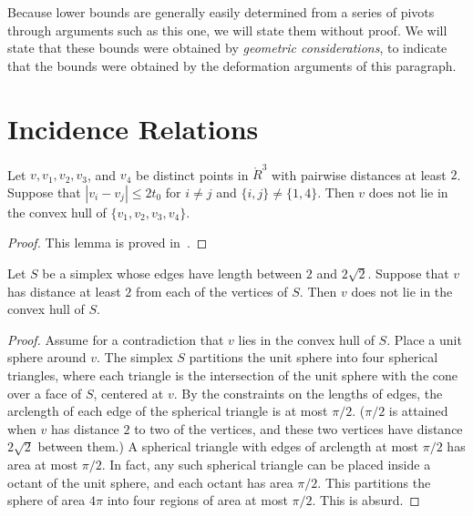 Because lower bounds are generally easily determined from a series
of pivots through arguments such as this one, we will state them
without proof. We will state that these bounds were obtained by
{\it geometric considerations}, to indicate that the bounds were
obtained by the deformation arguments of this paragraph.


\section{Incidence Relations}


\begin{lemma} \label{lemma:v-interior-alt}
Let $v,v_1,v_2,v_3$, and $v_4$ be distinct points in $\ring{R}^3$
with pairwise distances at least $2$.  Suppose that $|v_i-v_j|\le
2t_0$ for $i\ne j$ and $\{i,j\}\ne\{1,4\}$. Then $v$ does not lie
in the convex hull of $\{v_1,v_2,v_3,v_4\}$.
\end{lemma}

\begin{proof}
This lemma is proved in~\cite[Lemma 3.5]{part1}.
\end{proof}



\begin{lemma} \label{lemma:v-interior}
Let $S$ be a simplex whose edges have length between $2$ and
$2\sqrt2$.  Suppose that $v$ has distance at least $2$ from each
of the vertices of $S$.  Then $v$ does not lie in the convex hull
of $S$.
\end{lemma}

\begin{proof} Assume for a contradiction that $v$ lies in the
convex hull of $S$.   Place a unit sphere around $v$.  The simplex
$S$ partitions the unit sphere into four spherical triangles,
where each triangle is the intersection of the unit sphere with
the cone over a face of $S$, centered at $v$.   By the constraints
on the lengths of edges, the arclength of each edge of the
spherical triangle is at most $\pi/2$.  ($\pi/2$ is attained when
$v$ has distance $2$ to two of the vertices, and these two
vertices have distance $2\sqrt2$ between them.)  A spherical
triangle with edges of arclength at most $\pi/2$ has area at most
$\pi/2$.  In fact, any such spherical triangle can be placed
inside a octant of the unit sphere, and each octant has area
$\pi/2$. This partitions the sphere of area $4\pi$ into four
regions of area at most $\pi/2$. This is absurd.
\end{proof}

